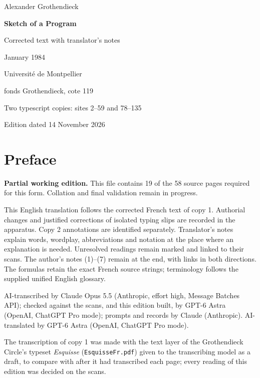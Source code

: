 \documentclass[11pt,a4paper]{article}
\newcommand{\EditionTitle}{Sketch of a Program}
\newcommand{\EditionForm}{Corrected text with translator’s notes}
\begin{document}
\begin{titlepage}
\centering
\vspace*{18mm}
{\Large Alexander Grothendieck\par}
\vspace{12mm}
{\Huge\bfseries\EditionTitle\par}
\vspace{8mm}
{\Large\EditionForm\par}
\vspace{14mm}
{\large January 1984\par}
\vfill
{\large Université de Montpellier\par fonds Grothendieck, cote 119\par}
\vspace{8mm}
{\normalsize Two typescript copies: sites 2--59 and 78--135\par}
\vspace{8mm}
{\normalsize Edition dated 14 November 2026\par}
\end{titlepage}
\thispagestyle{plain}
\section*{Preface}
\noindent\textbf{Partial working edition.} This file contains 19 of the 58 source pages required for this form. Collation and final validation remain in progress.\par\smallskip
This English translation follows the corrected French text of copy 1. Authorial changes and justified corrections of isolated typing slips are recorded in the apparatus. Copy 2 annotations are identified separately. Translator’s notes explain words, wordplay, abbreviations and notation at the place where an explanation is needed. Unresolved readings remain marked and linked to their scans. The author’s notes (1)–(7) remain at the end, with links in both directions. The formulas retain the exact French source strings; terminology follows the supplied unified English glossary.

\smallskip
AI-transcribed by Claude Opus 5.5 (Anthropic, effort high, Message Batches API); checked against the scans, and this edition built, by GPT-6 Astra (OpenAI, ChatGPT Pro mode); prompts and records by Claude (Anthropic).
AI-translated by GPT-6 Astra (OpenAI, ChatGPT Pro mode).

The transcription of copy 1 was made with the text layer of the Grothendieck Circle's typeset \textit{Esquisse} (\texttt{EsquisseFr.pdf}) given to the transcribing model as a draft, to compare with after it had transcribed each page; every reading of this edition was decided on the scans.
\end{document}
